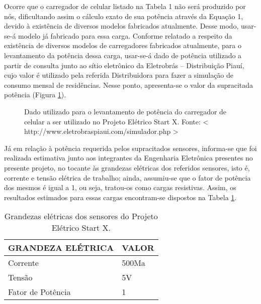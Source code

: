 Ocorre que o carregador de celular listado na Tabela 1 não será produzido por nós, dificultando assim o cálculo exato de sua potência através da Equação 1, devido à existência de diversos modelos fabricados atualmente. Desse modo, usar-se-á modelo já fabricado para essa carga. Conforme relatado a respeito da existência de diversos modelos de carregadores fabricados atualmente, para o levantamento da potência dessa carga, usar-se-á dado de potência utilizado a partir de consulta junto ao sítio eletrônico da Eletrobrás – Distribuição Piauí, cujo valor é utilizado pela referida Distribuidora para fazer a simulação de consumo mensal de residências. Nesse ponto, apresenta-se o valor da supracitada potência (Figura \ref{levantamento-de-potencias}).

\begin{figure}[h]
	\centering
	\caption{Dado utilizado para o levantamento de potência do carregador de celular a ser utilizado no Projeto Elétrico Start X. Fonte: <  http://www.eletrobraspiaui.com/simulador.php >}
	\label{levantamento-de-potencias}
\end{figure}

Já em relação à potência requerida pelos supracitados sensores, informa-se que foi realizada estimativa junto aos integrantes da Engenharia Eletrônica presentes no presente projeto, no tocante às grandezas elétricas dos referidos sensores, isto é, corrente e tensão elétrica de trabalho; ainda, assumiu-se que o fator de potência dos mesmos é igual a 1, ou seja, tratou-os como cargas resistivas. Assim, os resultados estimados para essas cargas encontram-se dispostos na Tabela \ref{grandezas-eletricas}.

\begin{table}[h]
\centering
\begin{tabular}{|l|l|}
\hline
\rowcolor[HTML]{329A9D} 
GRANDEZA ELÉTRICA & VALOR                                            \\ \hline
Corrente                                                    & 500Ma 
\\ \hline
Tensão                                                      & 5V
\\ \hline
Fator de Potência & 1                                                \\ \hline
\end{tabular}
\caption{Grandezas elétricas dos sensores do Projeto Elétrico Start X.}
\label{grandezas-eletricas}
\end{table}

